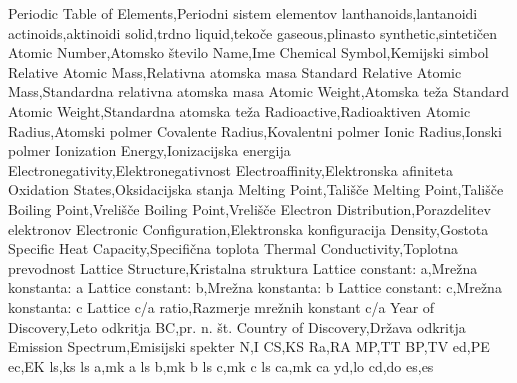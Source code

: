 %
%
%
%
%
Periodic Table of Elements,Periodni sistem elementov
lanthanoids,lantanoidi
actinoids,aktinoidi
solid,trdno
liquid,tekoče
gaseous,plinasto
synthetic,sintetičen
Atomic Number,Atomsko število
Name,Ime
Chemical Symbol,Kemijski simbol
Relative Atomic Mass,Relativna atomska masa
Standard Relative Atomic Mass,Standardna relativna atomska masa
Atomic Weight,Atomska teža
Standard Atomic Weight,Standardna atomska teža
Radioactive,Radioaktiven
Atomic Radius,Atomski polmer
Covalente Radius,Kovalentni polmer
Ionic Radius,Ionski polmer
Ionization Energy,Ionizacijska energija
Electronegativity,Elektronegativnost
Electroaffinity,Elektronska afiniteta
Oxidation States,Oksidacijska stanja
Melting Point,Tališče
Melting Point,Tališče
Boiling Point,Vrelišče
Boiling Point,Vrelišče
Electron Distribution,Porazdelitev elektronov
Electronic Configuration,Elektronska konfiguracija
Density,Gostota
Specific Heat Capacity,Specifična toplota
Thermal Conductivity,Toplotna prevodnost
Lattice Structure,Kristalna struktura
Lattice constant: a,Mrežna konstanta: a
Lattice constant: b,Mrežna konstanta: b
Lattice constant: c,Mrežna konstanta: c
Lattice c/a ratio,Razmerje mrežnih konstant c/a
Year of Discovery,Leto odkritja
BC,pr. n. št.
Country of Discovery,Država odkritja
Emission Spectrum,Emisijski spekter
N,I
CS,KS
Ra,RA
MP,TT
BP,TV
ed,PE
ec,EK
ls,ks
ls a,mk a
ls b,mk b
ls c,mk c
ls ca,mk ca
yd,lo
cd,do
es,es

